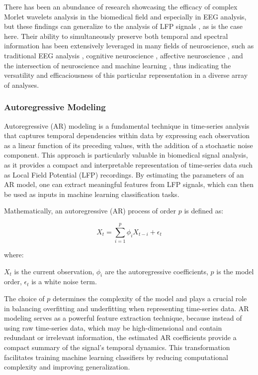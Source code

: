 \documentclass{article}
\begin{document}
There has been an abundance of research showcasing the efficacy of complex Morlet wavelets analysis in the biomedical field and especially in EEG analysis, but these findings can generalize to the analysis of LFP signals \cite{cohen2014}, as is the case here. Their ability to simultaneously preserve both temporal and spectral information has been extensively leveraged in many fields of neuroscience, such as traditional EEG analysis \cite{barlaam2018}, cognitive neuroscience \cite{perdomo2019}, affective neuroscience \cite{aruldass2022}, and the intersection of neuroscience and machine learning \cite{zhang2022}, thus indicating the versatility and efficaciousness of this particular representation in a diverse array of analyses.

\subsubsection{Autoregressive Modeling}

Autoregressive (AR) modeling is a fundamental technique in time-series analysis that captures temporal dependencies within data by expressing each observation as a linear function of its preceding values, with the addition of a stochastic noise component. This approach is particularly valuable in biomedical signal analysis, as it provides a compact and interpretable representation of time-series data such as Local Field Potential (LFP) recordings. By estimating the parameters of an AR model, one can extract meaningful features from LFP signals, which can then be used as inputs in machine learning classification tasks.

Mathematically, an autoregressive (AR) process of order \( p \) is defined as:

\[
X_t = \sum_{i=1}^{p} \phi_i X_{t-i} + \epsilon_t
\]

where:

\( X_t \) is the current observation,
\( \phi_i \) are the autoregressive coefficients,
\( p \) is the model order,
\( \epsilon_t \) is a white noise term. \cite{box2008}

The choice of \( p \) determines the complexity of the model and plays a crucial role in balancing overfitting and underfitting when representing time-series data. AR modeling serves as a powerful feature extraction technique, because instead of using raw time-series data, which may be high-dimensional and contain redundant or irrelevant information, the estimated AR coefficients provide a compact summary of the signal's temporal dynamics. This transformation facilitates training machine learning classifiers by reducing computational complexity and improving generalization.
\end{document}
